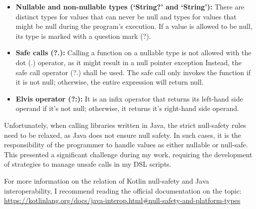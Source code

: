 \begin{itemize}
    \item \textbf{Nullable and non-nullable types (`String?' and `String'):} There are distinct types for values that can never be null and types for values that might be null during the program's execution. If a value is allowed to be null, its type is marked with a question mark (?).
    \item \textbf{Safe calls (?.):} Calling a function on a nullable type is not allowed with the dot (.) operator, as it might result in a null pointer exception Instead, the safe call operator (?.) shall be used. The safe call only invokes the function if it is not null; otherwise, the entire expression will return null.
    \item \textbf{Elvis operator (?:):} It is an infix operator that returns its left-hand side operand if it's not null; otherwise, it returns it's right-hand side operand.
\end{itemize}

Unfortunately, when calling libraries written in Java, the strict null-safety rules need to be relaxed, as Java does not ensure null safety. In such cases, it is the responsibility of the programmer to handle values as either nullable or null-safe. This presented a significant challenge during my work, requiring the development of strategies to manage unsafe calls in my DSL scripts.

For more information on the relation of Kotlin null-safety and Java interoperability, I recommend reading the official documentation on the topic: \url{https://kotlinlang.org/docs/java-interop.html\#null-safety-and-platform-types}

